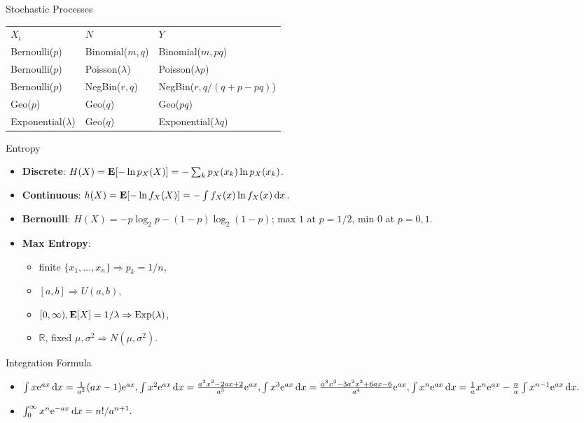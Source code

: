 \documentclass[landscape,a4paper]{article}
\begin{document}
\begin{cheatsheetcolumns}
\begin{card}{Stochastic Processes}
\begin{itemize}
\begin{center}
					\begin{tabular}{@{}lll@{}}
						$X_i$ & $N$ & $Y$\\
						Bernoulli($p$) & Binomial($m,q$) & Binomial($m,pq$)\\
						Bernoulli($p$) & Poisson($\lambda$) & Poisson($\lambda p$)\\
						Bernoulli($p$) & NegBin($r,q$) & NegBin($r, q/(q+p-pq)$)\\
						Geo($p$) & Geo($q$) & Geo($pq$)\\
						Exponential($\lambda$) & Geo($q$) & Exponential($\lambda q$)\\
					\end{tabular}
				\end{center}
			\end{itemize}
		\end{card}
		\begin{card}{Entropy}
			\begin{itemize}
				\item \textbf{Discrete}: $H(X)=\mathbf{E}[-\ln p_X(X)]=-\sum_k p_X(x_k)\ln p_X(x_k)$.
				\item \textbf{Continuous}: $h(X)=\mathbf{E}[-\ln f_X(X)]=-\int f_X(x)\ln f_X(x)\,\mathrm dx$.
				\item \textbf{Bernoulli}: $H(X)=-p\log_2p-(1-p)\log_2(1-p)$; max $1$ at $p=1/2$, min $0$ at $p=0,1$.
				\item \textbf{Max Entropy}:
				\begin{itemize}
					\item finite $\{x_1,\dots,x_n\}\Rightarrow p_k=1/n$,
					\item $[a,b]\Rightarrow U(a,b)$,
					\item $[0,\infty),\mathbf{E}[X]=1/\lambda\Rightarrow \operatorname{Exp}(\lambda)$,
					\item $\mathbb R$, fixed $\mu,\sigma^2\Rightarrow N(\mu,\sigma^2)$.
				\end{itemize}
			\end{itemize}
		\end{card}
		\begin{card}{Integration Formula}
			\begin{itemize}
				\item $\int x\mathrm{e}^{ax}\,\mathrm dx=\frac{1}{a^2}(ax-1)\mathrm{e}^{ax},\int x^2\mathrm{e}^{ax}\,\mathrm dx=\frac{a^2x^2-2ax+2}{a^3}\mathrm{e}^{ax},\int x^3\mathrm{e}^{ax}\,\mathrm dx=\frac{a^3x^3-3a^2x^2+6ax-6}{a^4}\mathrm{e}^{ax},\int x^n\mathrm{e}^{ax}\,\mathrm dx=\frac{1}{a}x^n\mathrm{e}^{ax}-\frac{n}{a}\int x^{n-1}\mathrm{e}^{ax}\,\mathrm dx.$
				\item $\int_0^{\infty}x^n\mathrm{e}^{-ax}\,\mathrm dx=n!/a^{n+1}.$

\end{itemize}
\end{card}
\end{cheatsheetcolumns}
\end{document}
